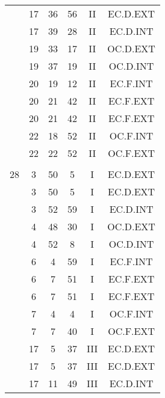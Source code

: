 \documentclass[12pt, a4paper]{article}
\begin{document}
\begin{multicols}{3}
{\begin{tabular}{c c c c c c}
	 	 	 	 & 17 & 36 & 56 & II & EC.D.EXT\\%
	 	 	 	 & 17 & 39 & 28 & II & EC.D.INT\\%
	 	 	 	 & 19 & 33 & 17 & II & OC.D.EXT\\%
	 	 	 	 & 19 & 37 & 19 & II & OC.D.INT\\%
	 	 	 	 & 20 & 19 & 12 & II & EC.F.INT\\%
	 	 	 	 & 20 & 21 & 42 & II & EC.F.EXT\\%
	 	 	 	 & 20 & 21 & 42 & II & EC.F.EXT\\%
	 	 	 	 & 22 & 18 & 52 & II & OC.F.INT\\%
	 	 	 	 & 22 & 22 & 52 & II & OC.F.EXT\\%
	 	 	 	 & & & & & \\%
	 	 	 	28 & 3 & 50 & 5 & I & EC.D.EXT\\%
	 	 	 	 & 3 & 50 & 5 & I & EC.D.EXT\\%
	 	 	 	 & 3 & 52 & 59 & I & EC.D.INT\\%
	 	 	 	 & 4 & 48 & 30 & I & OC.D.EXT\\%
	 	 	 	 & 4 & 52 & 8 & I & OC.D.INT\\%
	 	 	 	 & 6 & 4 & 59 & I & EC.F.INT\\%
	 	 	 	 & 6 & 7 & 51 & I & EC.F.EXT\\%
	 	 	 	 & 6 & 7 & 51 & I & EC.F.EXT\\%
	 	 	 	 & 7 & 4 & 4 & I & OC.F.INT\\%
	 	 	 	 & 7 & 7 & 40 & I & OC.F.EXT\\%
	 	 	 	 & 17 & 5 & 37 & III & EC.D.EXT\\%
	 	 	 	 & 17 & 5 & 37 & III & EC.D.EXT\\%
	 	 	 	 & 17 & 11 & 49 & III & EC.D.INT\\%

\end{tabular}}
\end{multicols}
\end{document}
